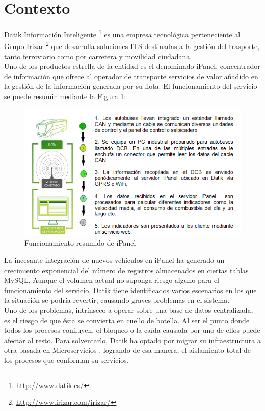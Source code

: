 \section{Contexto}
 
Datik Información Inteligente \footnote{\url{http://www.datik.es/}} es una empresa tecnológica perteneciente al Grupo Irizar \footnote{\url{http://www.irizar.com/irizar/}}  que desarrolla soluciones ITS destinadas a la gestión del trasporte, tanto ferroviario como por carretera y movilidad ciudadana.\\

Uno de los productos estrella de la entidad es el denominado iPanel, concentrador de  información que ofrece al operador de transporte servicios de valor añadido en la gestión de la información generada por su flota. El funcionamiento del servicio se puede resumir mediante la Figura \ref{fig:ipanel}:\\

\begin{figure}[h]
	\centering
	\includegraphics[width=1\textwidth]{Ilustraciones/ipanel_infraesctructure.png}
	\caption{Funcionamiento resumido de iPanel}
	\label{fig:ipanel}
\end{figure}

La incesante integración de nuevos vehículos en iPanel ha generado un crecimiento exponencial del número de registros almacenados en ciertas tablas MySQL. Aunque el volumen actual no suponga riesgo alguno para el funcionamiento del servicio, Datik tiene identificados varios escenarios en los que la situación se podría revertir, causando graves problemas en el sistema.\\

Uno de los problemas, intrínseco a operar sobre una base de datos centralizada, es el riesgo de que ésta se convierta en cuello de botella. Al ser el punto donde todos los procesos confluyen, el bloqueo o la caída causada por uno de ellos puede afectar al resto. Para solventarlo, Datik ha optado por migrar su infraestructura a otra basada en Microservicios \cite{newman2015building}, logrando de esa manera, el aislamiento total de los procesos que conforman su servicios.\\ 

